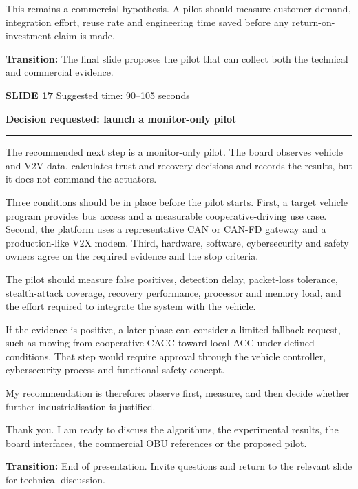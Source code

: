\documentclass[11pt,a4paper]{article}
\newcommand{\slidetitle}[3]{%
  \clearpage
  {\color{BrandCyan}\large\bfseries SLIDE #1}\hfill
  {\color{Muted}\small Suggested time: #3}\par
  \vspace{0.18cm}
  {\color{BrandBlue}\LARGE\bfseries #2}\par
  \vspace{0.20cm}
  {\color{BrandMagenta}\rule{1.1cm}{1.2pt}}\par
  \vspace{0.12cm}
}
\newcommand{\transition}[1]{%
  \vfill
  \colorbox{Panel}{%
    \parbox{\dimexpr\textwidth-2\fboxsep\relax}{%
      \raggedright\textbf{Transition:} #1}}
}
\begin{document}
This remains a commercial hypothesis. A pilot should measure customer demand, integration effort, reuse rate and engineering time saved before any return-on-investment claim is made.

\transition{The final slide proposes the pilot that can collect both the technical and commercial evidence.}

\slidetitle{17}{Decision requested: launch a monitor-only pilot}{90--105 seconds}

The recommended next step is a monitor-only pilot. The board observes vehicle and V2V data, calculates trust and recovery decisions and records the results, but it does not command the actuators.

Three conditions should be in place before the pilot starts. First, a target vehicle program provides bus access and a measurable cooperative-driving use case. Second, the platform uses a representative CAN or CAN-FD gateway and a production-like V2X modem. Third, hardware, software, cybersecurity and safety owners agree on the required evidence and the stop criteria.

The pilot should measure false positives, detection delay, packet-loss tolerance, stealth-attack coverage, recovery performance, processor and memory load, and the effort required to integrate the system with the vehicle.

If the evidence is positive, a later phase can consider a limited fallback request, such as moving from cooperative CACC toward local ACC under defined conditions. That step would require approval through the vehicle controller, cybersecurity process and functional-safety concept.

My recommendation is therefore: observe first, measure, and then decide whether further industrialisation is justified.

Thank you. I am ready to discuss the algorithms, the experimental results, the board interfaces, the commercial OBU references or the proposed pilot.

\transition{End of presentation. Invite questions and return to the relevant slide for technical discussion.}
\end{document}
